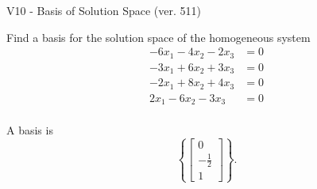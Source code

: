 \begin{exercise}
  \begin{exerciseTitle}V10 - Basis of Solution Space (ver. 511)\end{exerciseTitle}
  \begin{exerciseStatement}
    Find a basis for the solution space of the homogeneous system 
\begin{align*}
 -6 x_ 1 -4 x_ 2 -2 x_ 3 &= 0  \\ 
  -3 x_ 1 + 6 x_ 2 + 3 x_ 3 &= 0  \\ 
  -2 x_ 1 + 8 x_ 2 + 4 x_ 3 &= 0  \\ 
  2 x_ 1 -6 x_ 2 -3 x_ 3 &= 0  \\ 
 \end{align*}


 
  \end{exerciseStatement}

  \begin{exerciseAnswer}
   A basis is   
\[\left\{\left[\begin{array}{c}
0 \\
-\frac{1}{2} \\
1
\end{array}\right]\right\}.\]

  


  \end{exerciseAnswer}
\end{exercise}